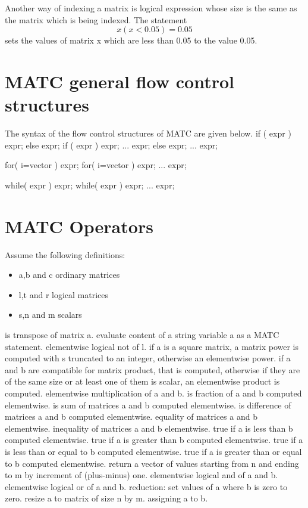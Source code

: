 Another way of indexing a matrix is logical expression whose size is the same as the matrix which is being indexed. The statement 
\[
  x(x < 0.05) = 0.05
\]
sets the values of matrix x which are less than 0.05 to the value 0.05. 



\section{MATC general flow control structures}

The syntax of the flow control structures of MATC are given below. 
\ttbegin
if ( expr ) expr; else expr;
if ( expr )
{
    expr;
    ...
    expr;
} else {
    expr;
    ...
    expr;
}

for( i=vector ) expr;
for( i=vector )
{
    expr;
    ...
    expr;
}

while( expr ) expr;
while( expr )
{
    expr;
    ...
    expr;
}
\ttend



\section{MATC Operators}

Assume the following definitions:
\begin{itemize}
\item a,b and c ordinary matrices  
\item l,t and r logical matrices 
\item s,n and m scalars 
\end{itemize}

\sifbegin
{} is transpose of matrix a. 
 evaluate content of a string variable a as a MATC statement. 
 elementwise logical not of l. 
 if a is a square matrix, a matrix power is computed with s truncated to an integer, otherwise an elementwise power. 
 if a and b are compatible for matrix product, that is computed, 
otherwise if they are of the same size or at least one of them is scalar, an elementwise product is computed. 
elementwise multiplication of a and b.  
 is fraction of a and b computed elementwise. 
 is sum of matrices a and b computed elementwise. 
 is difference of matrices a and b computed elementwise. 
 equality of matrices a and b elementwise.  
 inequality of matrices a and b elementwise.  
 true if a is less than b computed elementwise. 
 true if a is greater than b computed elementwise.
 true if a is less than or equal to b computed elementwise. 
 true if a is greater than or equal to b computed elementwise. 
 return a vector of values starting from n and ending to m by increment of (plus-minus) one.  
 elementwise logical and of a and b. 
 elementwise logical or of a and b. 
 reduction: set values of a where b is zero to zero. 
 resize a to matrix of size n by m. 
 assigning a to b. 
\sifend


